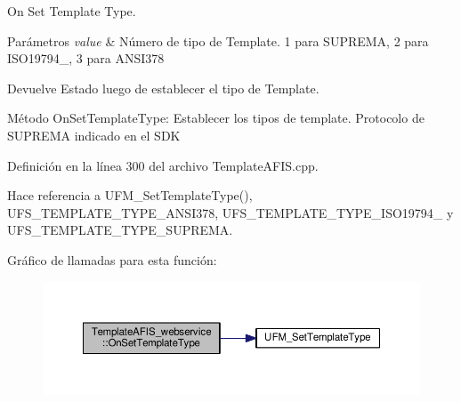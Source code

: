 On Set Template Type. 


\begin{DoxyParams}{Parámetros}
{\em value} & Número de tipo de Template. 1 para S\+U\+P\+R\+E\+MA, 2 para I\+S\+O19794\+\_, 3 para A\+N\+S\+I378 \\
\hline
\end{DoxyParams}
\begin{DoxyReturn}{Devuelve}
Estado luego de establecer el tipo de Template.
\end{DoxyReturn}
Método On\+Set\+Template\+Type\+: Establecer los tipos de template. Protocolo de S\+U\+P\+R\+E\+MA indicado en el S\+DK 

Definición en la línea 300 del archivo Template\+A\+F\+I\+S.\+cpp.



Hace referencia a U\+F\+M\+\_\+\+Set\+Template\+Type(), U\+F\+S\+\_\+\+T\+E\+M\+P\+L\+A\+T\+E\+\_\+\+T\+Y\+P\+E\+\_\+\+A\+N\+S\+I378, U\+F\+S\+\_\+\+T\+E\+M\+P\+L\+A\+T\+E\+\_\+\+T\+Y\+P\+E\+\_\+\+I\+S\+O19794\+\_ y U\+F\+S\+\_\+\+T\+E\+M\+P\+L\+A\+T\+E\+\_\+\+T\+Y\+P\+E\+\_\+\+S\+U\+P\+R\+E\+MA.

Gráfico de llamadas para esta función\+:\nopagebreak
\begin{figure}[H]
\begin{center}
\leavevmode
\includegraphics[width=350pt]{classTemplateAFIS__webservice_aa89af892ebe892d1a92f1e2dad5e998d_cgraph}
\end{center}
\end{figure}
\hypertarget{classTemplateAFIS__webservice_ad2d94adf36b56bf3306e52e5e20ecaab}{}\label{classTemplateAFIS__webservice_ad2d94adf36b56bf3306e52e5e20ecaab} 
